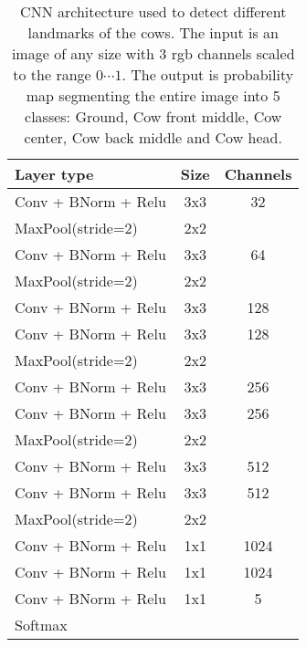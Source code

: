 \documentclass[10pt,a4paper,twocolumn]{article}
\begin{document}
\begin{table}
\begin{center}
\begin{tabular}{|l|c|c|}
\hline 
\textbf{Layer type} & \textbf{Size} & \textbf{Channels} \\ 
\hline 

Conv + BNorm + Relu & 3x3 & 32 \\ 
MaxPool(stride=2) & 2x2 &  \\ 
\hline 

Conv + BNorm + Relu & 3x3 & 64 \\ 
MaxPool(stride=2) & 2x2 &  \\ 
\hline 

Conv + BNorm + Relu & 3x3 & 128 \\ 
Conv + BNorm + Relu & 3x3 & 128 \\ 
MaxPool(stride=2) & 2x2 &  \\ 
\hline 

Conv + BNorm + Relu & 3x3 & 256 \\ 
Conv + BNorm + Relu & 3x3 & 256 \\ 
MaxPool(stride=2) & 2x2 &  \\ 
\hline 

Conv + BNorm + Relu & 3x3 & 512 \\ 
Conv + BNorm + Relu & 3x3 & 512 \\ 
MaxPool(stride=2) & 2x2 &  \\ 
\hline 

Conv + BNorm + Relu & 1x1 & 1024 \\ 
Conv + BNorm + Relu & 1x1 & 1024 \\ 
Conv + BNorm + Relu & 1x1 & 5 \\ 
Softmax & & \\
\hline 

\end{tabular} 
\end{center}
\caption{CNN architecture used to detect different landmarks of the cows. The input is an image of any size with 3 rgb channels scaled to the range $ 0\cdots1 $. The output is probability map segmenting the entire image into 5 classes: Ground, Cow front middle, Cow center, Cow back middle and Cow head.}
\label{tab:cownet}
\end{table}
\end{document}
